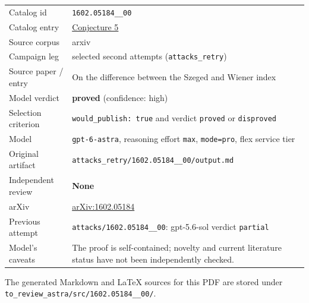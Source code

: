 \documentclass[
  11pt,
  a4paper,
]{article}
\newcounter{none} %
\begin{document}
{\def\LTcaptype{none} %
\begin{longtable}[]{@{}
  >{\raggedright\arraybackslash}p{}
  >{\raggedright\arraybackslash}p{}@{}}
\toprule\noalign{}
\endhead
\bottomrule\noalign{}
\endlastfoot
Catalog id & \texttt{1602.05184\_\_00} \\
Catalog entry &
\href{https://graph-theory-ai.github.io/graph-conjectures/arxiv/1602.05184__00/}{Conjecture
5} \\
Source corpus & arxiv \\
Campaign leg & selected second attempts (\texttt{attacks\_retry}) \\
Source paper / entry & On the difference between the Szeged and Wiener
index \\
Model verdict & \textbf{proved} (confidence: high) \\
Selection criterion & \texttt{would\_publish:\ true} and verdict
\texttt{proved} or \texttt{disproved} \\
Model & \texttt{gpt-6-astra}, reasoning effort \texttt{max},
\texttt{mode=pro}, flex service tier \\
Original artifact &
\texttt{attacks\_retry/1602.05184\_\_00/output.md} \\
Independent review & \textbf{None} \\
arXiv & \href{https://arxiv.org/abs/1602.05184}{arXiv:1602.05184} \\
Previous attempt & \texttt{attacks/1602.05184\_\_00}: gpt-5.6-sol
verdict \texttt{partial} \\
Model's caveats & The proof is self-contained; novelty and current
literature status have not been independently checked. \\
\end{longtable}
}

The generated Markdown and LaTeX sources for this PDF are stored under
\texttt{to\_review\_astra/src/1602.05184\_\_00/}.
\end{document}
